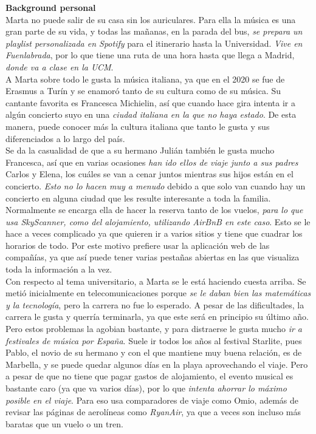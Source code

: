 \textbf{Background personal} \\

Marta no puede salir de su casa sin los auriculares. Para ella la música es una gran parte
de su vida, y todas las mañanas, en la parada del bus, \textit{se prepara un playlist personalizada
en Spotify} para el itinerario hasta la Universidad. \textit{Vive en Fuenlabrada}, por lo que tiene
una ruta de una hora hasta que llega a Madrid, \textit{donde va a clase en la UCM}. \\ 

A Marta sobre todo le gusta la música italiana, ya que en el 2020 se fue de Erasmus a Turín y se
enamoró tanto de su cultura como de su música. Su cantante favorita es Francesca Michielin, así que
cuando hace gira intenta ir a algún concierto suyo en una \textit{ciudad italiana en la que no haya
estado}. De esta manera, puede conocer más la cultura italiana que tanto le gusta y sus diferenciados
a lo largo del país. \\

Se da la casualidad de que a su hermano Julián también le gusta mucho Francesca, así que en varias
ocasiones \textit{han ido ellos de viaje junto a sus padres} Carlos y Elena, los cuáles se van a
cenar juntos mientras sus hijos están en el concierto. \textit{Esto no lo hacen muy a menudo} debido
a que solo van cuando hay un concierto en alguna ciudad que les resulte interesante a toda la familia.
Normalmente se encarga ella de hacer la reserva tanto de los vuelos, \textit{para lo que usa
SkyScanner, como del alojamiento, utilizando AirBnB en este caso}. Esto se le hace a veces complicado
ya que quieren ir a varios sitios y tiene que cuadrar los horarios de todo. Por este motivo prefiere usar la 
aplicación web de las compañías, ya que así puede tener varias pestañas abiertas en las que visualiza toda
la información a la vez. \\

Con respecto al tema universitario, a Marta se le está haciendo cuesta arriba. Se metió inicialmente
en telecomunicaciones porque \textit{se le daban bien las matemáticas y la tecnología}, pero la
carrera no fue lo esperado. A pesar de las dificultades, la carrera le gusta y querría terminarla,
ya que este será en principio su último año. Pero estos problemas la agobian bastante, y para
distraerse le gusta mucho \textit{ir a festivales de música por España}. Suele ir todos los años
al festival Starlite, pues Pablo, el novio de su hermano y con el que mantiene muy buena relación,
es de Marbella, y se puede quedar algunos días en la playa aprovechando el viaje. Pero a pesar de
que no tiene que pagar gastos de alojamiento, el evento musical es bastante caro (ya que va varios
días), por lo que \textit{intenta ahorrar lo máximo posible en el viaje}. Para eso usa comparadores
de viaje como Omio, además de revisar las páginas de aerolíneas como \textit{RyanAir}, ya que a veces son
incluso más baratas que un vuelo o un tren.

